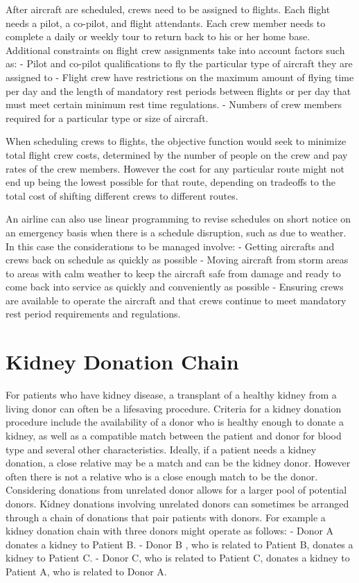 After aircraft are scheduled, crews need to be assigned to flights. Each flight needs a pilot, a co-pilot, and flight attendants. Each crew member needs to complete a daily or weekly tour to return back to his or her home base. Additional constraints on flight crew assignments take into account factors such as:
- Pilot and co-pilot qualifications to fly the particular type of aircraft they are assigned to
- Flight crew have restrictions on the maximum amount of flying time per day and the length of mandatory rest periods between flights or per day that must meet certain minimum rest time regulations.
- Numbers of crew members required for a particular type or size of aircraft.

When scheduling crews to flights, the objective function would seek to minimize total flight crew costs, determined by the number of people on the crew and pay rates of the crew members. However the cost for any particular route might not end up being the lowest possible for that route, depending on tradeoffs to the total cost of shifting different crews to different routes.

An airline can also use linear programming to revise schedules on short notice on an emergency basis when there is a schedule disruption, such as due to weather. In this case the considerations to be managed involve:
- Getting aircrafts and crews back on schedule as quickly as possible
- Moving aircraft from storm areas to areas with calm weather to keep the aircraft safe from damage and ready to come back into service as quickly and conveniently as possible
- Ensuring crews are available to operate the aircraft and that crews continue to meet mandatory rest period requirements and regulations.

\section*{Kidney Donation Chain}

For patients who have kidney disease, a transplant of a healthy kidney from a living donor can often be a lifesaving procedure. Criteria for a kidney donation procedure include the availability of a donor who is healthy enough to donate a kidney, as well as a compatible match between the patient and donor for blood type and several other characteristics. Ideally, if a patient needs a kidney donation, a close relative may be a match and can be the kidney donor. However often there is not a relative who is a close enough match to be the donor. Considering donations from unrelated donor allows for a larger pool of potential donors. Kidney donations involving unrelated donors can sometimes be arranged through a chain of donations that pair patients with donors. For example a kidney donation chain with three donors might operate as follows:
- Donor A donates a kidney to Patient B.
- Donor B , who is related to Patient B, donates a kidney to Patient C.
- Donor C, who is related to Patient C, donates a kidney to Patient A, who is related to Donor A.

